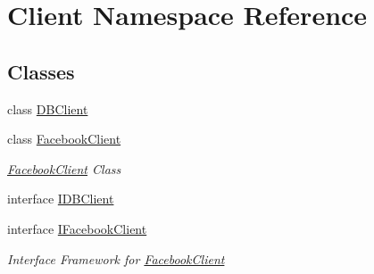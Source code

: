 \hypertarget{namespace_client}{}\section{Client Namespace Reference}
\label{namespace_client}
\subsection*{Classes}
\begin{DoxyCompactItemize}
\item 
class \hyperlink{class_client_1_1_d_b_client}{D\+B\+Client}
\item 
class \hyperlink{class_client_1_1_facebook_client}{Facebook\+Client}
\begin{DoxyCompactList}\small\item\em \hyperlink{class_client_1_1_facebook_client}{Facebook\+Client} Class \end{DoxyCompactList}\item 
interface \hyperlink{interface_client_1_1_i_d_b_client}{I\+D\+B\+Client}
\item 
interface \hyperlink{interface_client_1_1_i_facebook_client}{I\+Facebook\+Client}
\begin{DoxyCompactList}\small\item\em Interface Framework for \hyperlink{class_client_1_1_facebook_client}{Facebook\+Client} \end{DoxyCompactList}\end{DoxyCompactItemize}

